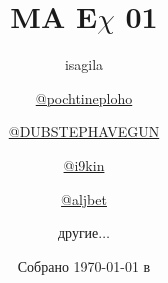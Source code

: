 \title{\huge \textbf{MA E\(\chi\) 01}}
\author{
	isagila
  \and
  \href{https://t.me/pochtineploho}{@pochtineploho}
  \and
  \href{https://t.me/DUBSTEPHAVEGUN}{@DUBSTEPHAVEGUN}
  \and
  \href{https://t.me/i9kin}{@i9kin}
  \and
  \href{https://t.me/aljbet}{@aljbet}
  \and
  другие\(\dotsc\)
}
\date{Собрано {\ddmmyyyydate\today} в \currenttime}
\newcommand{\githublink}{https://github.com/isagila/tesc}
